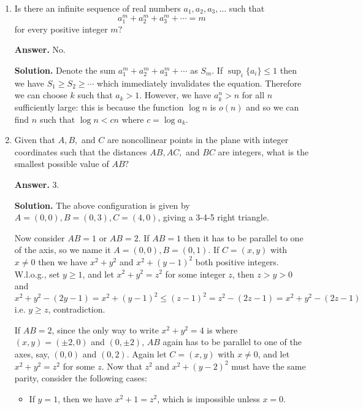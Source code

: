 \documentclass[11pt,a4paper]{article}
\newcommand{\<}{\langle}
\renewcommand{\>}{\rangle}
\begin{document}
\begin{enumerate}
   \textbf{Remark.} If $\lim_{x\to\infty} f(x) = c > 0$ (assuming $f$ decreases), then the integral converges given that 
   \[
   \int_0^{\infty}\frac{f(x)-f(x+1)}{f(x)}dx
   \le \int_0^{\infty}\frac{f(x)-f(x+1)}{c}dx
   =\int_0^1 \frac{f(x)-c}{c}dx
   \]
	
	\item [\textbf{B1}]
	Is there an infinite sequence of real numbers $a_1,a_2,a_3,\dots$ such that
	\[a_1^m+a_2^m+a_3^m+\cdots=m\]
	for every positive integer $m?$
	
	\textbf{Answer.} No. 
	
	\textbf{Solution.}
	Denote the sum $a_1^m+a_2^m+a_3^m+\cdots$ as $S_m$. 
	If $\sup_{i}\{a_i\}\le 1$ then we have $S_1\ge S_2\ge\cdots$ which immediately invalidates the equation. 
	Therefore we can choose $k$ such that $a_k>1$. 
	However, we have $a_k^n>n$ for all $n$ sufficiently large: 
	this is because the function $\log n$ is $o(n)$ and so we can find $n$ such that $\log n < cn$ where $c=\log a_k$. 
	
	\item [\textbf{B2}]
	Given that $A,B,$ and $C$ are noncollinear points in the plane with integer coordinates such that the distances $AB,AC,$ and $BC$ are integers, what is the smallest possible value of $AB?$
	
	\textbf{Answer.} 3. 
	
	\textbf{Solution.} The above configuration is given by $A=(0, 0), B=(0, 3), C=(4, 0)$, giving a 3-4-5 right triangle. 
	
	Now consider $AB=1$ or $AB=2$. 
	If $AB=1$ then it has to be parallel to one of the axis, so we name it $A=(0, 0), B=(0, 1)$. 
	If $C=(x, y)$ with $x\neq 0$ then we have $x^2+y^2$ and $x^2+(y-1)^2$ both positive integers. 
	W.l.o.g., set $y\ge 1$, and let $x^2+y^2=z^2$ for some integer $z$, then $z>y>0$ and 
	\[
	x^2+y^2-(2y-1)= x^2+(y-1)^2\le (z-1)^2= z^2-(2z-1) =x^2+y^2-(2z-1)
	\]
	i.e. $y\ge z$, contradiction. 
	
	If $AB=2$, since the only way to write $x^2+y^2=4$ is where $(x, y)=(\pm 2, 0)$ and $(0, \pm 2)$, 
	$AB$ again has to be parallel to one of the axes, say, $(0, 0)$ and $(0, 2)$. 
	Again let $C=(x, y)$ with $x\neq 0$, 
	and let $x^2+y^2=z^2$ for some $z$. 
	Now that $z^2$ and $x^2+(y-2)^2$ must have the same parity, 
	consider the following cases: 
	\begin{itemize}
		\item If $y=1$, then we have $x^2+1=z^2$, which is impossible unless $x=0$. 
		

\end{itemize}
\end{enumerate}
\end{document}
